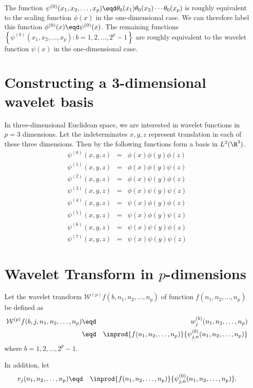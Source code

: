 The function 
$\psi^{(0)}(x_1, x_2, \ldots, x_p) \eqd \theta_0(x_1)\theta_0(x_2)\cdots\theta_0(x_p)$
is roughly equivalent to the scaling function $\phi(x)$ in the one-dimensional case.
We can therefore label this function $\phi^{(0)}(x) \eqd \psi^{(0)}(x)$.
The remaining functions
$\left\{ \psi^{(b)}(x_1, x_2, \ldots, x_p) : b = 1,2,\ldots,2^p-1 \right\}$
are roughly equivalent to the wavelet function $\psi(x)$ in the one-dimensional case.


\section {Constructing a 3-dimensional wavelet basis}
In three-dimensional Euclidean space, we are interested in wavelet functions
in $p=3$ dimensions.
Let the indeterminates $x,y,z$ represent translation in each of these three
dimensions.
Then by  the following functions form a basis in $L^2(\R^3)$.
   \begin{eqnarray*}
      \psi^{(0)}(x,y,z) &=& \phi(x) \phi(y) \phi(z) \\ 
      \psi^{(1)}(x,y,z) &=& \phi(x) \phi(y) \psi   (z) \\ 
      \psi^{(2)}(x,y,z) &=& \phi(x) \psi   (y) \phi(z) \\ 
      \psi^{(3)}(x,y,z) &=& \phi(x) \psi   (y) \psi   (z) \\ 
      \psi^{(4)}(x,y,z) &=& \psi   (x) \phi(y) \phi(z) \\ 
      \psi^{(5)}(x,y,z) &=& \psi   (x) \phi(y) \psi   (z) \\ 
      \psi^{(6)}(x,y,z) &=& \psi   (x) \psi   (y) \phi(z) \\ 
      \psi^{(7)}(x,y,z) &=& \psi   (x) \psi   (y) \psi   (z)
   \end{eqnarray*}

\section {Wavelet Transform in $p$-dimensions}
\begin{definition}
Let the wavelet transform $\mathcal{W}^{(p)}f(b,n_1,n_2,\ldots,n_p)$ of 
function $f(n_1,n_2,\ldots,n_p)$ be defined as
\begin{eqnarray*}
   \mathcal{W}^{(p)}f(b,j,n_1,n_2,\ldots,n_p)
   &\eqd&  w_j^{(b)}(n_1,n_2,\ldots,n_p) \\
   &\eqd&  \inprod{f(n_1, n_2, \ldots, n_p)}{\psi_{j,n}^{(b)}(n_1, n_2, \ldots, n_p)}
\end{eqnarray*} 
where $b=1,2,\ldots,2^p-1$.

In addition, let 
\begin{eqnarray*}
   v_j(n_1,n_2,\ldots,n_p) 
   &\eqd&  \inprod{f(n_1, n_2, \ldots, n_p)}{\psi_{j,n}^{(0)}(n_1, n_2, \ldots, n_p)}.
\end{eqnarray*} 
\end{definition}

